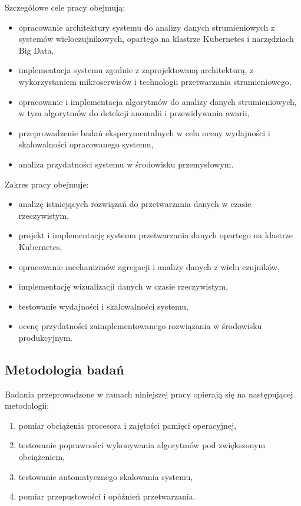 Szczegółowe cele pracy obejmują:
\begin{itemize}
    \item opracowanie architektury systemu do analizy danych strumieniowych z systemów wieloczujnikowych, opartego na klastrze Kubernetes i narzędziach Big Data,
    \item implementacja systemu zgodnie z zaprojektowaną architekturą, z wykorzystaniem mikroserwisów i technologii przetwarzania strumieniowego,
    \item opracowanie i implementacja algorytmów do analizy danych strumieniowych, w tym algorytmów do detekcji anomalii i przewidywania awarii,
    \item przeprowadzenie badań eksperymentalnych w celu oceny wydajności i skalowalności opracowanego systemu,
    \item analiza przydatności systemu w środowisku przemysłowym.
\end{itemize}

Zakres pracy obejmuje:
\begin{itemize}
    \item analizę istniejących rozwiązań do przetwarzania danych w czasie rzeczywistym,
    \item projekt i implementację systemu przetwarzania danych opartego na klastrze Kubernetes,
    \item opracowanie mechanizmów agregacji i analizy danych z wielu czujników,
    \item implementację wizualizacji danych w czasie rzeczywistym,
    \item testowanie wydajności i skalowalności systemu,
    \item ocenę przydatności zaimplementowanego rozwiązania w środowisku produkcyjnym.
\end{itemize}

\subsection{Metodologia badań}
\label{subsec:metodologia}

Badania przeprowadzone w ramach niniejszej pracy opierają się na następującej metodologii:

\begin{enumerate}
    \item pomiar obciążenia procesora i zajętości pamięci operacyjnej,
    \item testowanie poprawności wykonywania algorytmów pod zwiększonym obciążeniem,
    \item testowanie automatycznego skalowania systemu,
    \item pomiar przepustowości i opóźnień przetwarzania.
\end{enumerate}

